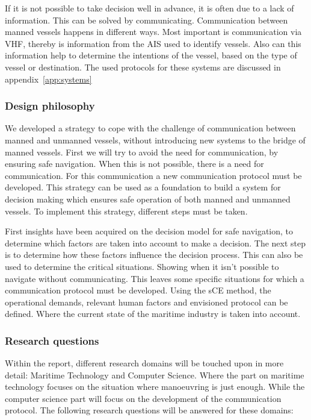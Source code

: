 If it is not possible to take decision well in advance, it is often due to a lack of information. This can be solved by communicating. Communication between manned vessels happens in different ways. Most important is communication via \ac{VHF}, thereby is information from the AIS used to identify vessels. Also can this information help to determine the intentions of the vessel, based on the type of vessel or destination. The used protocols for these systems are discussed in appendix~\ref{app:systems}

\subsubsection*{Design philosophy}
We developed a strategy to cope with the challenge of communication between manned and unmanned vessels, without introducing new systems to the bridge of manned vessels. 
First we will try to avoid the need for communication, by ensuring safe navigation. When this is not possible, there is a need for communication. For this communication a new communication protocol must be developed.
This strategy can be used as a foundation to build a system for decision making which ensures safe operation of both manned and unmanned vessels. To implement this strategy, different steps must be taken. 

First insights have been acquired on the decision model for safe navigation, to determine which factors are taken into account to make a decision. The next step is to determine how these factors influence the decision process. This can also be used to determine the critical situations. Showing when it isn't possible to navigate without communicating. This leaves some specific situations for which a communication protocol must be developed. Using the \acf{sCE} method, the operational demands, relevant human factors and envisioned protocol can be defined. Where the current state of the maritime industry is taken into account.

\subsubsection*{Research questions}
Within the report, different research domains will be touched upon in more detail: Maritime Technology and Computer Science. Where the part on maritime technology focuses on the situation where manoeuvring is just enough. While the computer science part will focus on the development of the communication protocol. The following research questions will be answered for these domains:

